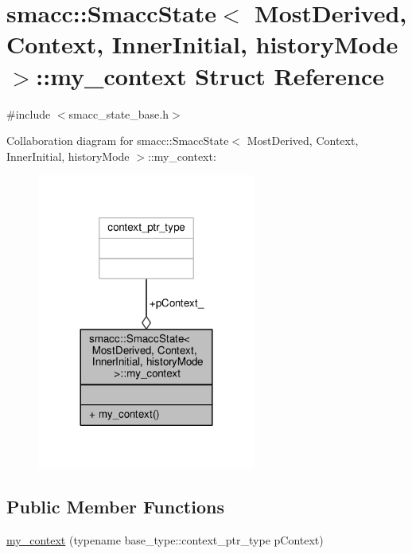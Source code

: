 \hypertarget{structsmacc_1_1SmaccState_1_1my__context}{}\section{smacc\+:\+:Smacc\+State$<$ Most\+Derived, Context, Inner\+Initial, history\+Mode $>$\+:\+:my\+\_\+context Struct Reference}
\label{structsmacc_1_1SmaccState_1_1my__context}


{\ttfamily \#include $<$smacc\+\_\+state\+\_\+base.\+h$>$}



Collaboration diagram for smacc\+:\+:Smacc\+State$<$ Most\+Derived, Context, Inner\+Initial, history\+Mode $>$\+:\+:my\+\_\+context\+:
\nopagebreak
\begin{figure}[H]
\begin{center}
\leavevmode
\includegraphics[width=204pt]{structsmacc_1_1SmaccState_1_1my__context__coll__graph}
\end{center}
\end{figure}
\subsection*{Public Member Functions}
\begin{DoxyCompactItemize}
\item 
\hyperlink{structsmacc_1_1SmaccState_1_1my__context_af9c11c27b17bbf7de0d4e21c87d49f6f}{my\+\_\+context} (typename base\+\_\+type\+::context\+\_\+ptr\+\_\+type p\+Context)
\end{DoxyCompactItemize}
